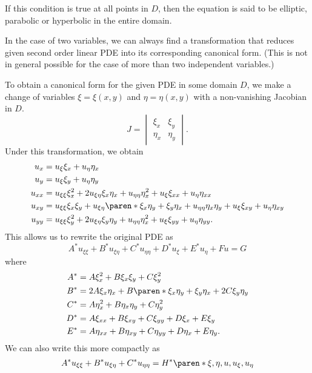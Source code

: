 \documentclass[11pt]{penrose}
\begin{document}
If this condition is true at all points in $D$, then the equation is said to be elliptic, parabolic or hyperbolic in the entire domain.

In the case of two variables, we can always find a transformation that reduces given second order linear PDE into its corresponding canonical form. (This is not in general possible for the case of more than two independent variables.)

To obtain a canonical form for the given PDE in some domain $D$, we make a change of variables $\xi = \xi(x, y)$ and $\eta = \eta(x, y)$ with a non-vanishing Jacobian in $D$.
\begin{equation}
    J = \begin{vmatrix} \xi_x & \xi_y \\ \eta_x & \eta_y \end{vmatrix}.
\end{equation}
Under this transformation, we obtain
\begin{align*}
    u_x    &= u_\xi \xi_x + u_\eta \eta_x\\
    u_y    &= u_\xi \xi_y + u_\eta \eta_y\\
    u_{xx} &= u_{\xi\xi} \xi_x^2 + 2u_{\xi\eta} \xi_x \eta_x + u_{\eta\eta} \eta_x^2 + u_\xi \xi_{xx} + u_\eta \eta_{xx}\\
    u_{xy} &= u_{\xi\xi} \xi_x \xi_y + u_{\xi\eta} \paren*{\xi_x \eta_y + \xi_y \eta_x} + u_{\eta\eta} \eta_x \eta_y + u_\xi \xi_{xy} + u_\eta \eta_{xy}\\
    u_{yy} &= u_{\xi\xi} \xi_y^2 + 2u_{\xi\eta} \xi_y \eta_y + u_{\eta\eta} \eta_x^2 + u_\xi \xi_{yy} + u_\eta \eta_{yy}.
\end{align*}
This allows us to rewrite the original PDE as
\begin{equation}
    A^{*} u_{\xi\xi} + B^{*} u_{\xi\eta} + C^{*} u_{\eta\eta} + D^{*} u_\xi + E^{*} u_\eta + F u = G
    \label{eq:2nd-transformed-xi-eta-full}
\end{equation}
where
\begin{align*}
    A^{*} &= A \xi_x^2 + B \xi_x \xi_y + C \xi_y^2\\
    B^{*} &= 2A\xi_x \eta_x + B \paren*{\xi_x \eta_y + \xi_y \eta_x} + 2C \xi_y \eta_y\\
    C^{*} &= A \eta_x^2 + B \eta_x \eta_y + C \eta_y^2\\
    D^{*} &= A \xi_{xx} + B \xi_{xy} + C \xi_{yy} + D \xi_{x} + E \xi_{y}\\
    E^{*} &= A \eta_{xx} + B \eta_{xy} + C \eta_{yy} + D \eta_{x} + E \eta_{y}.
\end{align*}
We can also write this more compactly as
\begin{equation}
    A^{*} u_{\xi\xi} + B^{*} u_{\xi\eta} + C^{*} u_{\eta\eta} = H^{*}\paren*{\xi, \eta, u, u_\xi, u_\eta}
    \label{eq:2nd-transformed-xi-eta}
\end{equation}
\end{document}
